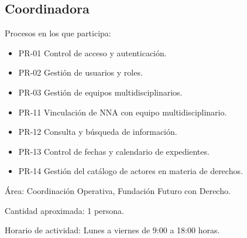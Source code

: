 \begin{Usuario}{\hypertarget{A.Coordinadora}{\subsection{Coordinadora}}}
	\item[Procesos en los que participa:] \cdtEmpty
	\begin{itemize}
		\item PR-01 Control de acceso y autenticación.
		\item PR-02 Gestión de usuarios y roles.
		\item PR-03 Gestión de equipos multidisciplinarios.
		\item PR-11 Vinculación de NNA con equipo multidisciplinario.
		\item PR-12 Consulta y búsqueda de información.
		\item PR-13 Control de fechas y calendario de expedientes.
		\item PR-14 Gestión del catálogo de actores en materia de derechos.
	\end{itemize}
	
	\item[Área:] Coordinación Operativa, Fundación Futuro con Derecho.
	\item[Cantidad aproximada:] 1 persona.
	\item[Horario de actividad:] Lunes a viernes de 9:00 a 18:00 horas.
\end{Usuario}

